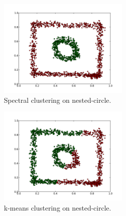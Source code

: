 \documentclass[conference]{IEEEtran}
\begin{document}
\begin{figure}[th]
\centering
\includegraphics[width=15pc]{spectral_circle-weird.pdf}
\caption{Spectral clustering on nested-circle.}
\label{spectral_circleweird}
\end{figure}

\begin{figure}[th]
\centering
\includegraphics[width=15pc]{kmeans_circle-weird.pdf}
\caption{k-means clustering on nested-circle.}
\label{kmeans_circleweird}
\end{figure}
\end{document}
